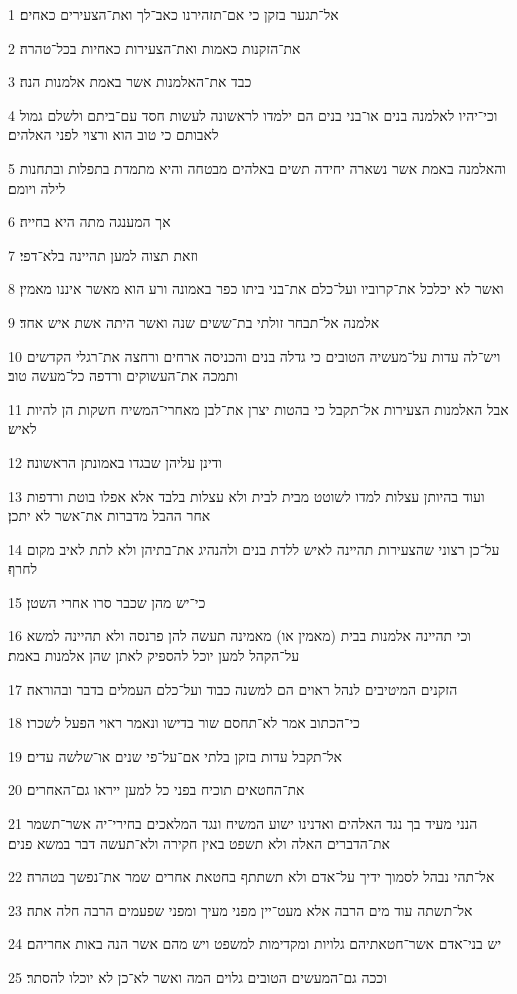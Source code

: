 \par 1 אל־תגער בזקן כי אם־תזהירנו כאב־לך ואת־הצעירים כאחים׃
\par 2 את־הזקנות כאמות ואת־הצעירות כאחיות בכל־טהרה׃
\par 3 כבד את־האלמנות אשר באמת אלמנות הנה׃
\par 4 וכי־יהיו לאלמנה בנים או־בני בנים הם ילמדו לראשונה לעשות חסד עם־ביתם ולשלם גמול לאבותם כי טוב הוא ורצוי לפני האלהים׃
\par 5 והאלמנה באמת אשר נשארה יחידה תשים באלהים מבטחה והיא מתמדת בתפלות ובתחנות לילה ויומם׃
\par 6 אך המענגה מתה היא בחייה׃
\par 7 וזאת תצוה למען תהיינה בלא־דפי׃
\par 8 ואשר לא יכלכל את־קרוביו ועל־כלם את־בני ביתו כפר באמונה ורע הוא מאשר איננו מאמין׃
\par 9 אלמנה אל־תבחר זולתי בת־ששים שנה ואשר היתה אשת איש אחד׃
\par 10 ויש־לה עדות על־מעשיה הטובים כי גדלה בנים והכניסה ארחים ורחצה את־רגלי הקדשים ותמכה את־העשוקים ורדפה כל־מעשה טוב׃
\par 11 אבל האלמנות הצעירות אל־תקבל כי בהטות יצרן את־לבן מאחרי־המשיח חשקות הן להיות לאיש׃
\par 12 ודינן עליהן שבגדו באמונתן הראשונה׃
\par 13 ועוד בהיותן עצלות למדו לשוטט מבית לבית ולא עצלות בלבד אלא אפלו בוטת ורדפות אחר ההבל מדברות את־אשר לא יתכן׃
\par 14 על־כן רצוני שהצעירות תהיינה לאיש ללדת בנים ולהנהיג את־בתיהן ולא לתת לאיב מקום לחרף׃
\par 15 כי־יש מהן שכבר סרו אחרי השטן׃
\par 16 וכי תהיינה אלמנות בבית (מאמין או) מאמינה תעשה להן פרנסה ולא תהיינה למשא על־הקהל למען יוכל להספיק לאתן שהן אלמנות באמת׃
\par 17 הזקנים המיטיבים לנהל ראוים הם למשנה כבוד ועל־כלם העמלים בדבר ובהוראה׃
\par 18 כי־הכתוב אמר לא־תחסם שור בדישו ונאמר ראוי הפעל לשכרו׃
\par 19 אל־תקבל עדות בזקן בלתי אם־על־פי שנים או־שלשה עדים׃
\par 20 את־החטאים תוכיח בפני כל למען ייראו גם־האחרים׃
\par 21 הנני מעיד בך נגד האלהים ואדנינו ישוע המשיח ונגד המלאכים בחירי־יה אשר־תשמר את־הדברים האלה ולא תשפט באין חקירה ולא־תעשה דבר במשא פנים׃
\par 22 אל־תהי נבהל לסמוך ידיך על־אדם ולא תשתתף בחטאת אחרים שמר את־נפשך בטהרה׃
\par 23 אל־תשתה עוד מים הרבה אלא מעט־יין מפני מעיך ומפני שפעמים הרבה חלה אתה׃
\par 24 יש בני־אדם אשר־חטאתיהם גלויות ומקדימות למשפט ויש מהם אשר הנה באות אחריהם׃
\par 25 וככה גם־המעשים הטובים גלוים המה ואשר לא־כן לא יוכלו להסתר׃

